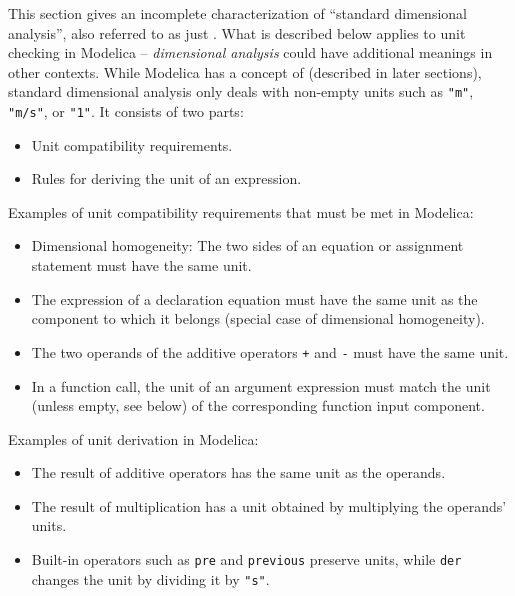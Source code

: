 This section gives an incomplete characterization of ``standard dimensional analysis'', also referred to as just .
What is described below applies to unit checking in Modelica -- \emph{dimensional analysis} could have additional meanings in other contexts.
While Modelica has a concept of  (described in later sections), standard dimensional analysis only deals with non-empty units such as \lstinline!"m"!, \lstinline!"m/s"!, or \lstinline!"1"!.
It consists of two parts:
\begin{itemize}
\item
  Unit compatibility requirements.
\item
  Rules for deriving the unit of an expression.
\end{itemize}

Examples of unit compatibility requirements that must be met in Modelica:
\begin{itemize}
\item
  Dimensional homogeneity: The two sides of an equation or assignment statement must have the same unit.
\item
  The expression of a declaration equation must have the same unit as the component to which it belongs (special case of dimensional homogeneity).
\item
  The two operands of the additive operators \lstinline!+! and \lstinline!-! must have the same unit.
\item
  In a function call, the unit of an argument expression must match the unit (unless empty, see below) of the corresponding function input component.
\end{itemize}

Examples of unit derivation in Modelica:
\begin{itemize}
\item
  The result of additive operators has the same unit as the operands.
\item
  The result of multiplication has a unit obtained by multiplying the operands' units.
\item
  Built-in operators such as \lstinline!pre! and \lstinline!previous! preserve units, while \lstinline!der! changes the unit by dividing it by \lstinline!"s"!.
\end{itemize}



